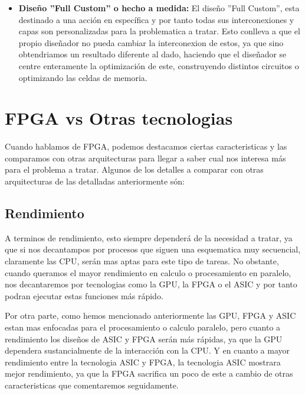 \documentclass[11pt,spanish,listoffigures,listoftables]{tfgetsinf}
\begin{document}
\begin{itemize}
\begin{itemize}
            \item{\textbf{Structured Gate Array:}} A diferencia de los otros tipos de
            estructuracion, que principalmente se centraban en la interconexion de
            los transistores, se centra en integrar tambi\'en un bloque y asi poder
            tener bloques configurables en el diseño. 
         \end{itemize}
         
         \item \textbf{Diseño ''Full Custom'' o hecho a medida:} El diseño ''Full Custom'',
         esta destinado a una acción en específica y por tanto todas sus
         interconexiones y capas son personalizadas para la problematica a
         tratar. Esto conlleva a que el propio diseñador no pueda cambiar la
         interconexion de estos, ya que sino obtendriamos un resultado diferente
         al dado, haciendo que el diseñador se centre enteramente la optimización
         de este, construyendo distintos circuitos o optimizando las celdas de
         memoria.

      \end{itemize}

\section{FPGA vs Otras tecnologias}
   Cuando hablamos de FPGA, podemos destacamos ciertas caracteristicas y las
   comparamos con otras arquitecturas para llegar a saber cual nos interesa más
   para el problema a tratar. Algunos de los detalles a comparar con otras
   arquitecturas de las detalladas anteriormente són:

   \subsection{Rendimiento}
      A terminos de rendimiento, esto siempre dependerá de la necesidad a
      tratar, ya que si nos decantampos por procesos que siguen una esquematica
      muy secuencial, claramente las CPU, serán mas aptas para este tipo de
      tareas. No obstante, cuando queramos el mayor rendimiento en calculo o
      procesamiento en paralelo, nos decantaremos por tecnologias como la GPU,
      la FPGA o el ASIC y por tanto podran ejecutar estas funciones más rápido.
      
      Por otra parte, como hemos mencionado anteriormente las GPU, FPGA y ASIC
      estan mas enfocadas para el procesamiento o calculo paralelo, pero cuanto
      a rendimiento los diseños de ASIC y FPGA serán más rápidas, ya que la GPU
      dependera sustancialmente de la interacción con la  CPU. Y en cuanto a
      mayor rendimiento entre la tecnologia ASIC y FPGA, la tecnologia ASIC
      mostrara mejor rendimiento, ya que la FPGA sacrifica un poco de este a
      cambio de otras caracteristicas que comentaremos seguidamente.
\end{document}

